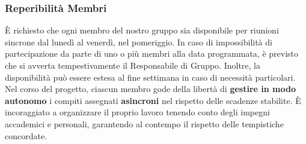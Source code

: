\documentclass{article}
\begin{document}
\subsubsection{Reperibilità Membri}
È richiesto che ogni membro del nostro gruppo sia disponibile per riunioni sincrone dal lunedì al venerdì, nel pomeriggio. In caso di impossibilità di partecipazione da parte di uno o più membri alla data programmata, è previsto che si avverta tempestivamente il Responsabile di Gruppo. Inoltre, la disponibilità può essere estesa al fine settimana in caso di necessità particolari.\\
Nel corso del progetto, ciascun membro gode della libertà di \textbf{gestire in modo autonomo} i compiti assegnati \textbf{asincroni} nel rispetto delle scadenze stabilite. È incoraggiato a organizzare il proprio lavoro tenendo conto degli impegni accademici e personali, garantendo al contempo il rispetto delle tempistiche concordate.\\
\end{document}
